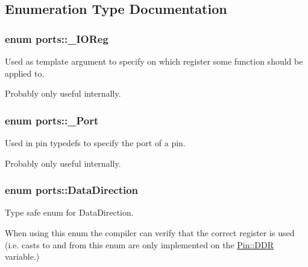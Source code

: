 \subsection{Enumeration Type Documentation}
\subsubsection[{\texorpdfstring{\+\_\+\+I\+O\+Reg}{_IOReg}}]{\setlength{\rightskip}{0pt plus 5cm}enum {\bf ports\+::\+\_\+\+I\+O\+Reg}\hspace{0.3cm}{\ttfamily [strong]}}\hypertarget{namespaceports_a739630fb6b9a9b963453db8e865b6b14}{}\label{namespaceports_a739630fb6b9a9b963453db8e865b6b14}


Used as template argument to specify on which register some function should be applied to. 

Probably only useful internally. 
\subsubsection[{\texorpdfstring{\+\_\+\+Port}{_Port}}]{\setlength{\rightskip}{0pt plus 5cm}enum {\bf ports\+::\+\_\+\+Port}\hspace{0.3cm}{\ttfamily [strong]}}\hypertarget{namespaceports_a9949317f344930bd6ad1097e80c97b67}{}\label{namespaceports_a9949317f344930bd6ad1097e80c97b67}


Used in pin {\ttfamily typedef}s to specify the port of a pin. 

Probably only useful internally. 
\subsubsection[{\texorpdfstring{Data\+Direction}{DataDirection}}]{\setlength{\rightskip}{0pt plus 5cm}enum {\bf ports\+::\+Data\+Direction}\hspace{0.3cm}{\ttfamily [strong]}}\hypertarget{namespaceports_a46987e78fa447129742fadda5eccafb4}{}\label{namespaceports_a46987e78fa447129742fadda5eccafb4}


Type safe enum for Data\+Direction. 

When using this enum the compiler can verify that the correct register is used (i.\+e. casts to and from this enum are only implemented on the \hyperlink{structports_1_1Pin_aaebb4d6cb5db0635fe8e7d6e7d315c7f}{Pin\+::\+D\+DR} variable.)

